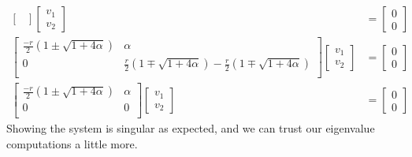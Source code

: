 \documentclass{article}
\begin{document}
\begin{align*}
\begin{bmatrix}
\end{bmatrix}
\begin{bmatrix}
v_{1}\\
v_{2}
\end{bmatrix}
&=
\begin{bmatrix}
0\\
0
\end{bmatrix}
\\
\begin{bmatrix}
\frac{-r}{2}\left( 1 \pm \sqrt{1 + 4\alpha} \right)	&	\alpha		\\
0	&	\frac{r}{2}\left( 1 \mp \sqrt{1 + 4\alpha} \right) - \frac{r}{2} \left( 1 \mp \sqrt{1 + 4\alpha} \right)\\
\end{bmatrix}
\begin{bmatrix}
v_{1}\\
v_{2}
\end{bmatrix}
&=
\begin{bmatrix}
0\\
0
\end{bmatrix}
\\
\begin{bmatrix}
\frac{-r}{2}\left( 1 \pm \sqrt{1 + 4\alpha} \right)	&	\alpha		\\
0	&		0\\
\end{bmatrix}
\begin{bmatrix}
v_{1}\\
v_{2}
\end{bmatrix}
&=
\begin{bmatrix}
0\\
0
\end{bmatrix}
\end{align*}
Showing the system is singular as expected, and we can trust our eigenvalue computations a little more.
\end{document}
